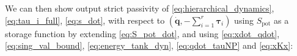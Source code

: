 \documentclass[../main.tex]{subfiles}
\begin{document}
We can then show output strict passivity of \eqref{eq:hierarchical_dynamics}, \eqref{eq:tau_i_full}, \eqref{eq:s_dot}, with respect to $\left( \dot{\bm{q}},-\sum_{i=1}^r\bm{\tau}_{i} \right)$ using $S_{\mathrm{pot}}$ as a storage function by extending \eqref{eq:S_pot_dot}, and using \eqref{eq:xdot_qdot}, \eqref{eq:sing_val_bound}, \eqref{eq:energy_tank_dyn}, \eqref{eq:qdot_tauNP} and \eqref{eq:xKx}:
\end{document}
